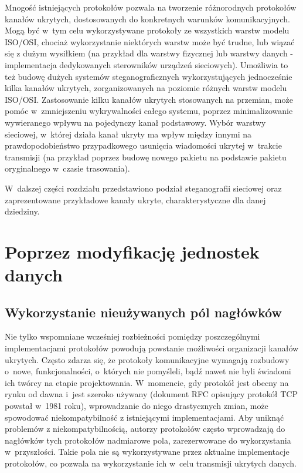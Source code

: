 \documentclass[a4paper, twoside, openright, 12pt]{report}
\begin{document}
    Mnogość istniejących protokołów pozwala na tworzenie różnorodnych protokołów
    kanałów ukrytych, dostosowanych do konkretnych warunków komunikacyjnych.
    Mogą być w~tym celu wykorzystywane protokoły ze wszystkich warstw modelu
    ISO/OSI, chociaż wykorzystanie niektórych warstw może być trudne, lub wiązać
    się z dużym wysiłkiem (na przykład dla warstwy fizycznej lub warstwy danych -
    implementacja dedykowanych sterowników urządzeń sieciowych). Umożliwia to
    też budowę dużych systemów steganograficznych wykorzystujących jednocześnie
    kilka kanałów ukrytych, zorganizowanych na poziomie różnych warstw modelu ISO/OSI.
    Zastosowanie kilku kanałów ukrytych stosowanych na przemian, może pomóc w~zmniejszeniu
    wykrywalności całego systemu, poprzez minimalizowanie wywieranego wpływu na pojedynczy
    kanał podstawowy. Wybór warstwy sieciowej, w~której działa kanał ukryty
    ma wpływ między innymi na prawdopodobieństwo przypadkowego usunięcia wiadomości
    ukrytej w~trakcie transmisji (na przykład poprzez budowę nowego pakietu na podstawie
    pakietu oryginalnego w~czasie trasowania).

    W~dalszej części rozdziału przedstawiono podział steganografii sieciowej
    oraz zaprezentowane przykładowe kanały ukryte, charakterystyczne dla danej
    dziedziny.
    \section{Poprzez modyfikację jednostek danych} \label{MODYFIKACJAPAKIETOW}
        \subsection{Wykorzystanie nieużywanych pól nagłówków}
        Nie tylko wspomniane wcześniej rozbieżności pomiędzy poszczególnymi
        implementacjami protokołów powodują powstanie możliwości organizacji kanałów ukrytych.
        Często zdarza się, że protokoły komunikacyjne wymagają rozbudowy o~nowe,
        funkcjonalności, o~których nie pomyśleli, bądź nawet nie byli świadomi
        ich twórcy na etapie projektowania. W~momencie, gdy protokół jest obecny
        na rynku od dawna i~jest szeroko używany (dokument RFC opisujący protokół TCP
        powstał w~1981 roku\cite{TCPRFC}), wprowadzanie do niego drastycznych zmian,
        może spowodować niekompatybilność z istniejącymi implementacjami.
        Aby uniknąć problemów z niekompatybilnością, autorzy protokołów często wprowadzają
        do nagłówków tych protokołów nadmiarowe pola, zarezerwowane do wykorzystania
        w~przyszłości. Takie pola nie są wykorzystywane przez aktualne implementacje
        protokołów, co pozwala na wykorzystanie ich w~celu transmisji ukrytych danych.
\end{document}
